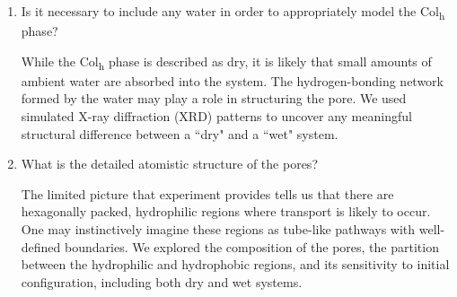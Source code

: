 \documentclass[journal=jpcbfk,manuscript=article]{achemso}
\begin{document}
\begin{enumerate}
    \item Is it necessary to include any water in order to appropriately model the 
    Col\textsubscript{h} phase? \label{point:water}

	While the Col\textsubscript{h} phase is described as dry, it is likely
	that small amounts of ambient water are absorbed into the system. The 
	hydrogen-bonding network formed by the water may play a role in structuring 
	the pore. We used simulated X-ray diffraction (XRD) patterns to uncover any 
	meaningful structural difference between a ``dry" and a ``wet" system.

	\item What is the detailed atomistic structure of the pores?\label{point:composition}

	The limited picture that experiment provides tells us that there are hexagonally packed, 
	hydrophilic regions where transport is likely to occur. One may instinctively imagine these 
	regions as tube-like pathways with well-defined boundaries. We explored the composition
	of the pores, the partition between the hydrophilic and hydrophobic regions, and its 
	sensitivity to initial configuration, including both dry and wet systems. 

  \end{enumerate}
  
%
\end{document}
